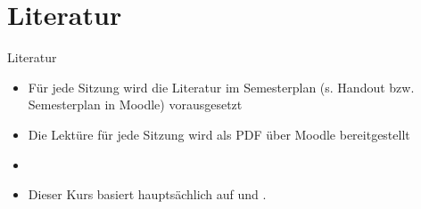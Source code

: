 %
\section{Literatur}

\begin{frame}{Literatur}

\begin{itemize}
	\item Für jede Sitzung wird die Literatur im Semesterplan (s. Handout bzw. Semesterplan in Moodle) vorausgesetzt
	\item Die Lektüre für jede Sitzung wird als PDF über Moodle bereitgestellt
	\item[]
	\item Dieser Kurs basiert hauptsächlich auf \citet{Luedeling09a,Meibauer&Co07a} und \citet{Repp&Co12a}.
\end{itemize}		

\end{frame}